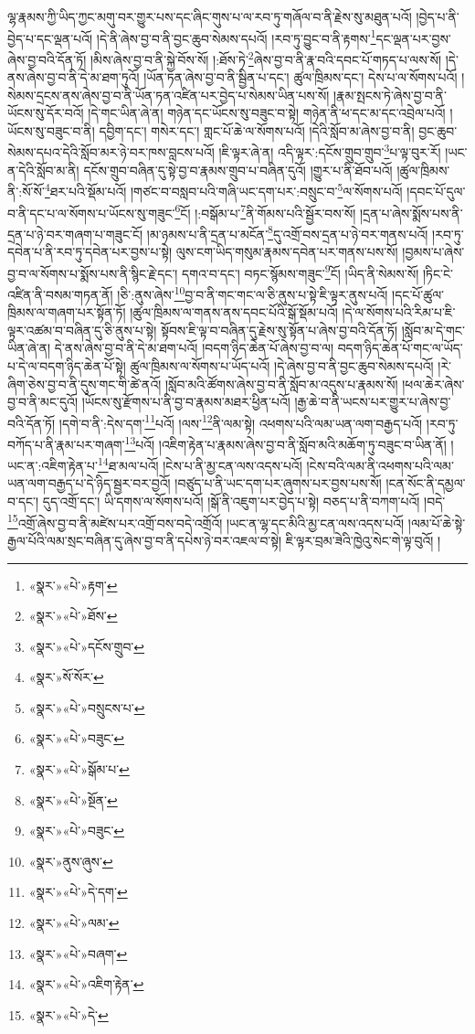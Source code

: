 ལྷ་རྣམས་ཀྱི་ཡིད་ཀྱང་མགུ་བར་གྱུར་པས་དང་ཞིང་གུས་པ་ལ་རབ་ཏུ་གཞོལ་བ་ནི་རྗེས་སུ་མཐུན་པའོ། །བྱེད་པ་ནི་བྱེད་པ་དང་ལྡན་པའོ། །དེ་ནི་ཞེས་བྱ་བ་ནི་བྱང་ཆུབ་སེམས་དཔའོ། །རབ་ཏུ་བྱུང་བ་ནི་རྟགས་\footnote{«སྣར་»«པེ་»རྟག་}དང་ལྡན་པར་བྱས་ཞེས་བྱ་བའི་དོན་ཏོ། །མིས་ཞེས་བྱ་བ་ནི་སྐྱེ་བོས་སོ། །:ཐོས་ཏེ་\footnote{«སྣར་»«པེ་»ཐོས་}ཞེས་བྱ་བ་ནི་རྣ་བའི་དབང་པོ་གཏད་པ་ལས་སོ། །དེ་ནས་ཞེས་བྱ་བ་ནི་དེ་མ་ཐག་ཏུའོ། །ཡོན་ཏན་ཞེས་བྱ་བ་ནི་སྦྱིན་པ་དང་། ཚུལ་ཁྲིམས་དང་། དེས་པ་ལ་སོགས་པའོ། །སེམས་དྲངས་ནས་ཞེས་བྱ་བ་ནི་ཡོན་ཏན་འཛིན་པར་བྱེད་པ་སེམས་ཡིན་པས་སོ། །རྣམ་སྤངས་ཏེ་ཞེས་བྱ་བ་ནི་ཡོངས་སུ་དོར་བའོ། །དེ་གང་ཡིན་ཞེ་ན། གཉེན་དང་ཡོངས་སུ་བཟུང་བ་སྟེ། གཉེན་ནི་ཕ་དང་མ་དང་འབྲེལ་པའོ། །ཡོངས་སུ་བཟུང་བ་ནི། དབྱིག་དང་། གསེར་དང་། གླང་པོ་ཆེ་ལ་སོགས་པའོ། །དེའི་སློབ་མ་ཞེས་བྱ་བ་ནི། བྱང་ཆུབ་སེམས་དཔའ་དེའི་སློབ་མར་ཉེ་བར་ཁས་བླངས་པའོ། །ཇི་ལྟར་ཞེ་ན། འདི་ལྟར་:དངོས་གྲུབ་གྲུབ་\footnote{«སྣར་»«པེ་»དངོས་གྲུབ་}པ་ལྟ་བུར་རོ། །ཡང་ན་དེའི་སློབ་མ་ནི། དངོས་གྲུབ་བཞིན་དུ་སྟེ་བྱ་བ་རྣམས་གྲུབ་པ་བཞིན་དུའོ། །གྱུར་པ་ནི་ཐོབ་པའོ། །ཚུལ་ཁྲིམས་ནི་:སོ་སོ་\footnote{«སྣར་»སོ་སོར་}ཐར་པའི་སྡོམ་པའོ། །གཙང་བ་བསླབ་པའི་གཞི་ཡང་དག་པར་:བསྲུང་བ་\footnote{«སྣར་»«པེ་»བསྲུངས་པ་}ལ་སོགས་པའོ། །དབང་པོ་དུལ་བ་ནི་དང་པ་ལ་སོགས་པ་ཡོངས་སུ་གཟུང་\footnote{«སྣར་»«པེ་»བཟུང་}ངོ། །:བསྒོམ་པ་\footnote{«སྣར་»«པེ་»སྒོམ་པ་}ནི་གོམས་པའི་སྦྱོར་བས་སོ། །དྲན་པ་ཞེས་སྨོས་པས་ནི་དྲན་པ་ཉེ་བར་གཞག་པ་གཟུང་ངོ། །མ་ཉམས་པ་ནི་དྲན་པ་མངོན་\footnote{«སྣར་»«པེ་»སྔོན་}དུ་འགྲོ་བས་དྲན་པ་ཉེ་བར་གནས་པའོ། །རབ་ཏུ་དབེན་པ་ནི་རབ་ཏུ་དབེན་པར་བྱས་པ་སྟེ། ལུས་ངག་ཡིད་གསུམ་རྣམས་དབེན་པར་གནས་པས་སོ། །བྱམས་པ་ཞེས་བྱ་བ་ལ་སོགས་པ་སྨོས་པས་ནི་སྙིང་རྗེ་དང་། དགའ་བ་དང་། བཏང་སྙོམས་གཟུང་\footnote{«སྣར་»«པེ་»བཟུང་}ངོ། །ཡིད་ནི་སེམས་སོ། །ཏིང་ངེ་འཛིན་ནི་བསམ་གཏན་ནོ། །ཅི་:ནུས་ཞེས་\footnote{«སྣར་»ནུས་ཞུས་}བྱ་བ་ནི་གང་གང་ལ་ཅི་ནུས་པ་སྟེ་ཇི་ལྟར་ནུས་པའོ། །དང་པོ་ཚུལ་ཁྲིམས་ལ་གཞག་པར་སྟོན་ཏོ། །ཚུལ་ཁྲིམས་ལ་གནས་ནས་དབང་པོའི་སྒོ་སྡོམ་པའོ། །དེ་ལ་སོགས་པའི་རིམ་པ་ཇི་ལྟར་འཚམ་བ་བཞིན་དུ་ཅི་ནུས་པ་སྟེ། སྟོབས་ཇི་ལྟ་བ་བཞིན་དུ་རྗེས་སུ་སྟོན་པ་ཞེས་བྱ་བའི་དོན་ཏོ། །སློབ་མ་དེ་གང་ཡིན་ཞེ་ན། དེ་ནས་ཞེས་བྱ་བ་ནི་དེ་མ་ཐག་པའོ། །བདག་ཉིད་ཆེན་པོ་ཞེས་བྱ་བ་ལ། བདག་ཉིད་ཆེན་པོ་གང་ལ་ཡོད་པ་དེ་ལ་བདག་ཉིད་ཆེན་པོ་སྟེ། ཚུལ་ཁྲིམས་ལ་སོགས་པ་ཡོད་པའོ། །དེ་ཞེས་བྱ་བ་ནི་བྱང་ཆུབ་སེམས་དཔའོ། །རེ་ཞིག་ཅེས་བྱ་བ་ནི་དུས་གང་གི་ཚེ་ནའོ། །སློབ་མའི་ཚོགས་ཞེས་བྱ་བ་ནི་སློབ་མ་འདུས་པ་རྣམས་སོ། །ཕལ་ཆེར་ཞེས་བྱ་བ་ནི་མང་དུའོ། །ཡོངས་སུ་རྫོགས་པ་ནི་བྱ་བ་རྣམས་མཐར་ཕྱིན་པའོ། །རྒྱ་ཆེ་བ་ནི་ཡངས་པར་གྱུར་པ་ཞེས་བྱ་བའི་དོན་ཏོ། །དགེ་བ་ནི་:དེས་དག་\footnote{«སྣར་»«པེ་»དེ་དག་}པའོ། །ལས་\footnote{«སྣར་»«པེ་»ལམ་}ནི་ལམ་སྟེ། འཕགས་པའི་ལམ་ཡན་ལག་བརྒྱད་པའོ། །རབ་ཏུ་བཀོད་པ་ནི་རྣམ་པར་གཞག་\footnote{«སྣར་»«པེ་»བཞག་}པའོ། །འཇིག་རྟེན་པ་རྣམས་ཞེས་བྱ་བ་ནི་སློབ་མའི་མཆོག་ཏུ་བཟུང་བ་ཡིན་ནོ། །ཡང་ན་:འཇིག་རྟེན་པ་\footnote{«སྣར་»«པེ་»འཇིག་རྟེན་}ཐ་མལ་པའོ། །ངེས་པ་ནི་མྱ་ངན་ལས་འདས་པའོ། །ངེས་བའི་ལམ་ནི་འཕགས་པའི་ལམ་ཡན་ལག་བརྒྱད་པ་དེ་ཉིད་སྦྱར་བར་བྱའོ། །བཙུད་པ་ནི་ཡང་དག་པར་ཞུགས་པར་བྱས་པས་སོ། །ངན་སོང་ནི་དམྱལ་བ་དང་། དུད་འགྲོ་དང་། ཡི་དགས་ལ་སོགས་པའོ། །སྒོ་ནི་འཇུག་པར་བྱེད་པ་སྟེ། བཅད་པ་ནི་བཀག་པའོ། །བདེ་\footnote{«སྣར་»«པེ་»དེ་}འགྲོ་ཞེས་བྱ་བ་ནི་མཛེས་པར་འགྲོ་བས་བདེ་འགྲོའོ། །ཡང་ན་ལྷ་དང་མིའི་མྱ་ངན་ལས་འདས་པའོ། །ལམ་པོ་ཆེ་སྟེ་རྒྱལ་པོའི་ལམ་སྲང་བཞིན་དུ་ཞེས་བྱ་བ་ནི་དཔེས་ཉེ་བར་འཇལ་བ་སྟེ། ཇི་ལྟར་བྲམ་ཟེའི་ཁྱེའུ་སེང་གེ་ལྟ་བུའོ། །
